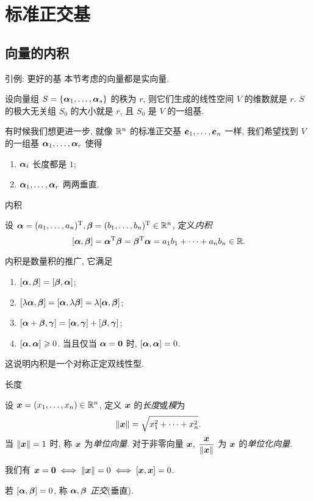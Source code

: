 \section{标准正交基}

\subsection{向量的内积}

\begin{frame}{引例: 更好的基}
	\onslide<+->
	本节考虑的向量都是实向量.

	\onslide<+->
	设向量组 $S=\{\bma_1,\dots,\bma_s\}$ 的秩为 $r$, 则它们生成的线性空间 $V$ 的维数就是 $r$.
	\onslide<+->
	$S$ 的极大无关组 $S_0$ 的大小就是 $r$, 且 $S_0$ 是 $V$ 的一组基.

	\onslide<+->
	有时候我们想更进一步, 就像 $\BR^n$ 的标准正交基 $\bfe_1,\dots,\bfe_n$ 一样, 我们希望找到 $V$ 的一组基 $\bma_1,\dots,\bma_r$ 使得
	\begin{enumerate}
		\item $\bma_i$ \alert{长度}都是 $1$;
		\item $\bma_1,\dots,\bma_r$ 两两\alert{垂直}.
	\end{enumerate}
\end{frame}


\begin{frame}{内积}
	\onslide<+->
	\begin{definition}[内积]
		设 $\bma=(a_1,\dots,a_n)^\rmT,\bmb=(b_1,\dots,b_n)^\rmT\in\BR^n$, 定义\emph{内积}
		\[[\bma,\bmb]=\bma^\rmT\bmb=\bmb^\rmT\bma=a_1b_1+\cdots+a_nb_n\in\BR.\]
	\end{definition}
	\onslide<+->
	内积是数量积的推广, 它满足
	\begin{enumerate}
		\item $[\bma,\bmb]=[\bmb,\bma]$;
		\item $[\lambda\bma,\bmb]=[\bma,\lambda\bmb]=\lambda[\bma,\bmb]$;
		\item $[\bma+\bmb,\bmg]=[\bma,\bmg]+[\bmb,\bmg]$;
		\item $[\bma,\bma]\ge 0$. 当且仅当 $\bma={\bf0}$ 时, $[\bma,\bma]=0$.
	\end{enumerate}
	\onslide<+->
	这说明内积是一个对称正定双线性型.
\end{frame}


\begin{frame}{长度}
	\onslide<+->
	\begin{definition}[单位向量]
		设 $\bfx=(x_1,\dots,x_n)\in\BR^n$, 定义 $\bfx$ 的\emph{长度}或\emph{模}为
		\[\|\bfx\|=\sqrt{x_1^2+\cdots+x_n^2}.\]
		当 $\|\bfx\|=1$ 时, 称 $\bfx$ 为\emph{单位向量}.
		对于非零向量 $\bfx$, \alert{$\dfrac{\bfx}{\|\bfx\|}$} 为 $\bfx$ 的\emph{单位化向量}.
	\end{definition}
	\onslide<+->
	我们有 $\bfx={\bf0}\iff\|\bfx\|=0\iff[\bfx,\bfx]=0$.
	\onslide<+->
	\begin{definition}
		若 $[\bma,\bmb]=0$, 称 $\bma,\bmb$ \emph{正交}(垂直).
	\end{definition}
\end{frame}


